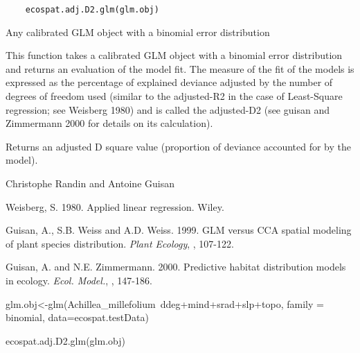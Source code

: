 \documentclass[a4paper]{book}
\begin{document}
%
\begin{Usage}
\begin{verbatim}
    ecospat.adj.D2.glm(glm.obj)
\end{verbatim}
\end{Usage}
%
\begin{Arguments}
\begin{ldescription}
\item[\code{glm.obj}] Any calibrated GLM object with a binomial error distribution
\end{ldescription}
\end{Arguments}
%
\begin{Details}\relax
This function takes a calibrated GLM object with a binomial error distribution and returns an evaluation of the model fit.
The measure of the fit of the models is expressed as the percentage of explained deviance adjusted by the number of degrees
of freedom used (similar to the adjusted-R2 in the case of Least-Square regression; see Weisberg 1980) and is called the adjusted-D2
(see guisan and Zimmermann 2000 for details on its calculation).
\end{Details}
%
\begin{Value}
Returns an adjusted D square value (proportion of deviance accounted for by the model).
\end{Value}
%
\begin{Author}\relax
Christophe Randin  and Antoine Guisan 
\end{Author}
%
\begin{References}\relax
Weisberg, S. 1980. Applied linear regression. Wiley.

Guisan, A., S.B. Weiss and A.D. Weiss. 1999. GLM versus CCA spatial modeling of plant species distribution. \emph{Plant Ecology}, , 107-122.

Guisan, A. and N.E. Zimmermann. 2000. Predictive habitat distribution models in ecology. \emph{Ecol. Model.}, , 147-186.
\end{References}
%
\begin{Examples}
\begin{ExampleCode}

glm.obj<-glm(Achillea_millefolium~ddeg+mind+srad+slp+topo, 
family = binomial, data=ecospat.testData)

ecospat.adj.D2.glm(glm.obj)

\end{ExampleCode}
\end{Examples}
\end{document}

